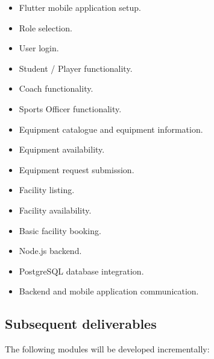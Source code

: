 \documentclass[11pt,a4paper]{article}
\begin{document}
\begin{itemize}[leftmargin=0.7cm]

    \item Flutter mobile application setup.

    \item Role selection.

    \item User login.

    \item Student / Player functionality.

    \item Coach functionality.

    \item Sports Officer functionality.

    \item Equipment catalogue and equipment information.

    \item Equipment availability.

    \item Equipment request submission.

    \item Facility listing.

    \item Facility availability.

    \item Basic facility booking.

    \item Node.js backend.

    \item PostgreSQL database integration.

    \item Backend and mobile application communication.

\end{itemize}

\subsection{Subsequent deliverables}

The following modules will be developed incrementally:
\end{document}
